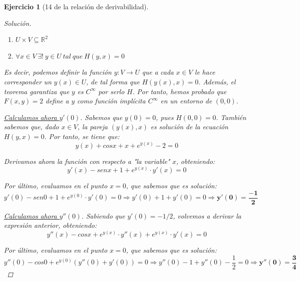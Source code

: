 \documentclass[11pt, a4paper, titlepage]{article}
\newcommand{\bm}[1]{\boldsymbol{#1}}
\theoremstyle{exercise-style}
\newtheorem*{ejer}{Ejercicio}
\theoremstyle{theorem-style}
\begin{document}
\begin{ejer}[14 de la relación de derivabilidad]
\begin{proof}[Solución]
\begin{enumerate}
\item $U\times V \subseteq \mathbb{R}^2$
\item $\forall x \in V \ \exists ! \ y \in U\ tal\ que \ H(y,x) = 0$
\end{enumerate}

Es decir, podemos definir la función $y:V \longrightarrow U$ que a cada $x\in V$ le hace corresponder un $y(x)\in U$, de tal forma que $H(y(x),x) = 0$. Además, el teorema garantiza que $y$ es $C^{\infty}$ por serlo $H$. Por tanto, hemos probado que $F(x,y)=2$ define a $y$ como función implícita $C^{\infty}$ en un entorno de $(0,0)$.

\underline{Calculamos ahora $y'(0)$}. Sabemos que $y(0)=0$, pues $H(0,0) = 0$. También sabemos que, dado $x\in V$, la pareja $(y(x),x)$ es solución de la ecuación $H(y,x)=0$. Por tanto, se tiene que:
\vspace{0.5em}
$$y(x) + cosx + x + e^{y(x)} - 2 = 0$$

Derivamos ahora la función con respecto a "la variable" $x$, obteniendo:
\vspace{0.5em}
$$y'(x) - senx + 1 + e^{y(x)}\cdot y'(x) = 0$$

Por último, evaluamos en el punto $x=0$, que sabemos que es solución:
$$y'(0) - sen0 + 1 + e^{y(0)}\cdot y'(0) = 0 \Rightarrow y'(0) + 1 + y'(0) = 0 \Rightarrow \bm{y'(0) = \frac{-1}{2}}$$

\underline{Calculamos ahora $y''(0)$}. Sabiendo que $y'(0) = -1/2$, volvemos a derivar la expresión anterior, obteniendo:
\vspace{0.5em}
$$y''(x) - cosx + e^{y(x)}\cdot y''(x) + e^{y(x)}\cdot y'(x)= 0$$

Por último, evaluamos en el punto $x=0$, que sabemos que es solución:
$$y''(0) - cos0 + e^{y(0)}\left( y''(0) + y'(0) \right) = 0 \Rightarrow y''(0) - 1 + y''(0) - \frac{1}{2} = 0 \Rightarrow \bm{y''(0) = \frac{3}{4}}$$
\end{proof}
\end{ejer}
\end{document}
